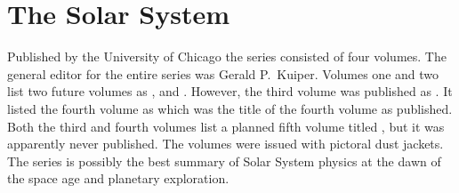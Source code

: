 
\section{The Solar System}

Published by the University of Chicago the series consisted of four
volumes.  The general editor for the entire series was Gerald
P.\ Kuiper. Volumes one and two list two future volumes as , and .  However,
the third volume was published as . It
listed the fourth volume as 
which was the title of the fourth volume as published. Both the third
and fourth volumes list a planned fifth volume titled , but it was apparently never published. The
volumes were issued with pictoral dust jackets.  The series is
possibly the best summary of Solar System physics at the dawn of the
space age and planetary exploration.

